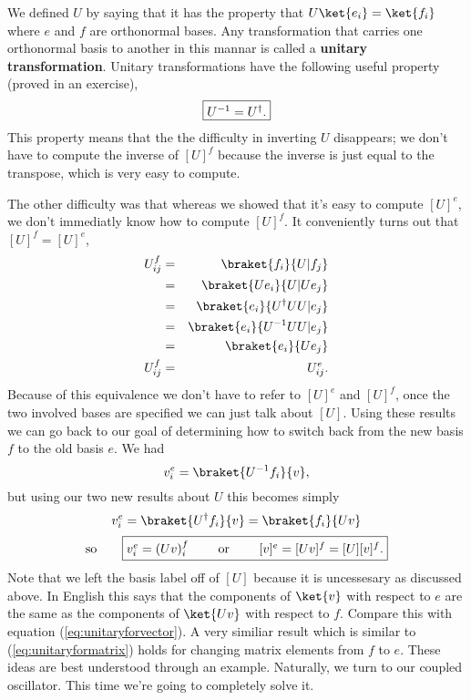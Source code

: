 We defined $U$ by saying that it has the property that $U\ket{e_i} = \ket{f_i}$ where $e$ and $f$ are orthonormal bases.  Any transformation that carries one orthonormal basis to another in this mannar is called a \textbf{unitary transformation}.  Unitary transformations have the following useful property (proved in an exercise),
\begin{displaymath} \framebox{$U^{-1} = U^{\dag}$.} \end{displaymath}
This property means that the the difficulty in inverting $U$ disappears; we don't have to compute the inverse of $[U]^f$ because the inverse is just equal to the transpose, which is very easy to compute.

The other difficulty was that whereas we showed that it's easy to compute $[U]^e$, we don't immediatly know how to compute $[U]^f$.  It conveniently turns out that $[U]^f = [U]^e$,
\begin{eqnarray*} U^f_{ij} &=& \braket{f_i}{U|f_j} \\ &=& \braket{Ue_i}{U|Ue_j} \\ &=& \braket{e_i}{U^{\dag}UU|e_j} \\ 
&=& \braket{e_i}{U^{-1}UU|e_j} \\ &=& \braket{e_i}{Ue_j} \\ U^f_{ij} &=& U^e_{ij}. \end{eqnarray*}
Because of this equivalence we don't have to refer to $[U]^e$ and $[U]^f$, once the two involved bases are specified we can just talk about $[U]$.  Using these results we can go back to our goal of determining how to switch back from the new basis $f$ to the old basis $e$.  We had
\begin{displaymath} v_i^e = \braket{U^{-1}f_i}{v}, \end{displaymath}
but using our two new results about $U$ this becomes simply
\begin{displaymath} v_i^e = \braket{U^{\dag}f_i}{v} = \braket{f_i}{Uv} \end{displaymath}
\begin{displaymath} \textrm{so} \qquad  \framebox{$v_i^e = (Uv)_i^f$ \qquad or \qquad $[v]^e =[Uv]^f = [U][v]^f$.} \end{displaymath}
Note that we left the basis label off of $[U]$ because it is uncessesary as discussed above.  In English this says that the components of $\ket{v}$ with respect to $e$ are the same as the components of $\ket{Uv}$ with respect to $f$.  Compare this with equation (\ref{eq:unitaryforvector}).  A very similiar result which is similar to (\ref{eq:unitaryformatrix}) holds for changing matrix elements from $f$ to $e$.  These ideas are best understood through an example.  Naturally, we turn to our coupled oscillator.  This time we're going to completely solve it.

